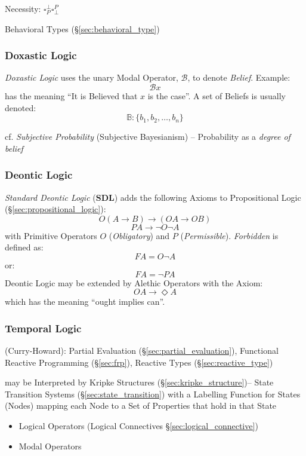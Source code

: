 Necessity: $\square^{\bot}_P \square^P_{\bot}$

\fist Behavioral Types (\S\ref{sec:behavioral_type})



\subsubsection{Doxastic Logic}\label{sec:doxastic_logic}

\emph{Doxastic Logic} uses the unary Modal Operator, $\mathcal{B}$, to
denote \emph{Belief}. Example:
\[
  \mathcal{B} x
\]
has the meaning ``It is Believed that $x$ is the case''. A set of
Beliefs is usually denoted:
\[
  \mathbb{B}: \{ b_1, b_2, \ldots, b_n \}
\]

cf. \emph{Subjective Probability} (Subjective Bayesianism) -- Probability as a
\emph{degree of belief}



\subsubsection{Deontic Logic}\label{sec:deontic_logic}

\emph{Standard Deontic Logic} ($\mathbf{SDL}$) adds the following
Axioms to Propositional Logic (\S\ref{sec:propositional_logic}):
\[
  O(A \rightarrow B) \rightarrow (OA \rightarrow OB)
\]
\[
  PA \rightarrow \neg O \neg A
\]
with Primitive Operators $O$ (\emph{Obligatory}) and $P$
(\emph{Permissible}). \emph{Forbidden} is defined as:
\[
  FA = O \neg A
\]
or:
\[
  FA = \neg P A
\]
Deontic Logic may be extended by Alethic Operators with the Axiom:
\[
  OA \rightarrow \Diamond A
\]
which has the meaning ``ought implies can''.



\subsubsection{Temporal Logic}\label{sec:temporal_logic}

(Curry-Howard): Partial Evaluation (\S\ref{sec:partial_evaluation}),
Functional Reactive Programming (\S\ref{sec:frp}), Reactive Types
(\S\ref{sec:reactive_type})

may be Interpreted by Kripke Structures
(\S\ref{sec:kripke_structure})-- State Transition Systems
(\S\ref{sec:state_transition}) with a Labelling Function for States
(Nodes) mapping each Node to a Set of Properties that hold in that
State

\begin{itemize}
  \item Logical Operators (Logical Connectives
    \S\ref{sec:logical_connective})
  \item Modal Operators
\end{itemize}


